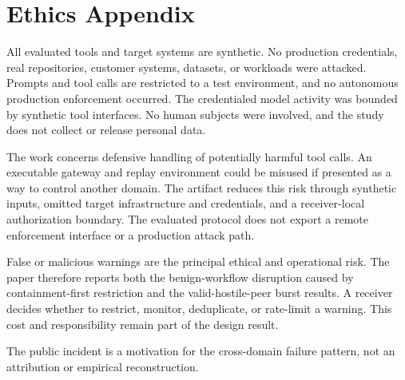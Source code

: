 \section{Ethics Appendix}

All evaluated tools and target systems are synthetic. No production credentials, real repositories, customer systems, datasets, or workloads were attacked. Prompts and tool calls are restricted to a test environment, and no autonomous production enforcement occurred. The credentialed model activity was bounded by synthetic tool interfaces. No human subjects were involved, and the study does not collect or release personal data.

The work concerns defensive handling of potentially harmful tool calls. An executable gateway and replay environment could be misused if presented as a way to control another domain. The artifact reduces this risk through synthetic inputs, omitted target infrastructure and credentials, and a receiver-local authorization boundary. The evaluated protocol does not export a remote enforcement interface or a production attack path.

False or malicious warnings are the principal ethical and operational risk. The paper therefore reports both the benign-workflow disruption caused by containment-first restriction and the valid-hostile-peer burst results. A receiver decides whether to restrict, monitor, deduplicate, or rate-limit a warning. This cost and responsibility remain part of the design result.

The public incident is a motivation for the cross-domain failure pattern, not an attribution or empirical reconstruction.
